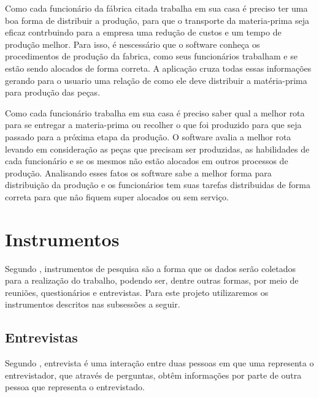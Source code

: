 \par Como cada funcionário da fábrica citada trabalha em sua casa é preciso ter
uma boa forma de distribuir a produção, para que o transporte da materia-prima
seja eficaz contrbuindo para a empresa uma redução de custos e um tempo de
produção melhor.
Para isso, é nescessário que o software conheça os procedimentos de
produção da fabrica, como seus funcionários trabalham e se estão sendo alocados
de forma correta. A aplicação cruza todas essas informações gerando para o
usuario uma relação de como ele deve distribuir a matéria-prima para produção
das peças.

\par Como cada funcionário trabalha em sua casa é preciso saber qual a
melhor rota para se entregar a materia-prima ou recolher o que foi produzido
para que seja passado para a próxima etapa da produção. O software avalia a
melhor rota levando em consideração as peças que precisam ser produzidas, as
habilidades de cada funcionário e se os mesmos não estão alocados em outros
processos de produção. Analisando esses fatos os software sabe a melhor forma
para distribuição da produção e os funcionários tem
suas tarefas distribuidas de forma correta para que não fiquem super alocados ou
sem serviço.


\section{Instrumentos}

\par Segundo , instrumentos de pesquisa são a
forma que os dados serão coletados para a realização do trabalho, podendo ser,
dentre outras formas, por meio de reuniões, questionários e entrevistas. Para
este projeto utilizaremos os instrumentos descritos nas subsessões a seguir.

\subsection{Entrevistas}
\par Segundo , entrevista é
uma interação entre duas pessoas em que uma representa o entrevistador, 
que através de perguntas, obtêm informações por parte de outra pessoa que
representa o entrevistado.





